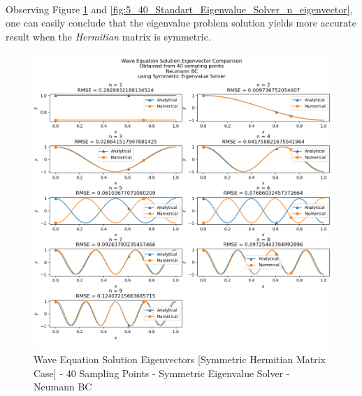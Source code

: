 \documentclass[letterpaper,12pt]{article}
\begin{document}
\paragraph{} Observing Figure \ref{fig:4_40_Symmetric_Eigenvalue_Solver_n_eigenvector} and \ref{fig:5_40_Standart_Eigenvalue_Solver_n_eigenvector}, one can easily conclude that the eigenvalue problem solution yields more accurate result when the \textit{Hermitian} matrix is symmetric.

\begin{figure}[H]
\centerline{\includegraphics[width=\linewidth]{figures/4_40_Symmetric_Eigenvalue_Solver_n_eigenvector.png}}
\caption{Wave Equation Solution Eigenvectors [Symmetric Hermitian Matrix Case] - 40 Sampling Points - Symmetric Eigenvalue Solver - Neumann BC}
\label{fig:4_40_Symmetric_Eigenvalue_Solver_n_eigenvector}
\end{figure}
\end{document}
